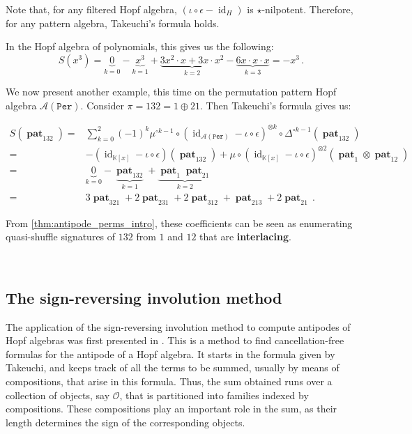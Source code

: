 \documentclass[12pt, reqno]{amsart}
\theoremstyle{definition}
\DeclareMathOperator{\id}{id}
\DeclareMathOperator{\pat}{\mathbf{pat}}
\begin{document}
Note that, for any filtered Hopf algebra, $( \iota \circ \epsilon - \id_H)$ is $\star$-nilpotent.
Therefore, for any pattern algebra, Takeuchi's formula holds.


In the Hopf algebra of polynomials, this gives us the following:
$$S(x^3) = \underbrace{0}_{k = 0} - \underbrace{x^3}_{k = 1} + \underbrace{3 x^2 \cdot x + 3 x \cdot x^2}_{k=2} - \underbrace{6 x \cdot x \cdot x}_{k = 3} = - x^3 \, .$$


We now present another example, this time on the permutation pattern Hopf algebra $\mathcal A(\mathtt{Per})$.
Consider $\pi = 132 = 1 \oplus 21$. Then Takeuchi's formula gives us:


\begin{align*}
S(\pat_{132}) =& \sum_{k=0}^2 (-1)^k \mu^{\circ k-1} \circ (\id_{\mathcal A(\mathtt{Per})} - \iota \circ \epsilon)^{\otimes k} \circ \Delta^{\circ k-1}(\pat_{132})\\
=& -(\id_{\mathbb{K}[x]} - \iota \circ \epsilon)(\pat_{132}) + \mu \circ (\id_{\mathbb{K}[x]} - \iota\circ\epsilon)^{\otimes 2}(\pat_1 \otimes \pat_{12}) \\
=& \underbrace{0}_{k = 0} - \underbrace{\pat_{132}}_{k=1} + \underbrace{\pat_1 \pat_{21}}_{k=2} \\
=& 3 \pat_{321} + 2 \pat_{231} + 2 \pat_{312} + \pat_{213} + 2 \pat_{21} \, .
\end{align*}

From \cref{thm:antipode_perms_intro}, these coefficients can be seen as enumerating quasi-shuffle signatures of $132$ from $1$ and $12$ that are \textbf{interlacing}.



\

\subsection{The sign-reversing involution method}

The application of the sign-reversing involution method to compute antipodes of Hopf algebras was first presented in \cite{BS2017}.
This is a method to find cancellation-free formulas for the antipode of a Hopf algebra.
It starts in the formula given by Takeuchi, and keeps track of all the terms to be summed, usually by means of compositions, that arise in this formula.
Thus, the sum obtained runs over a collection of objects, say $\mathcal O$, that is partitioned into families indexed by compositions.
These compositions play an important role in the sum, as their length determines the sign of the corresponding objects.
\end{document}
